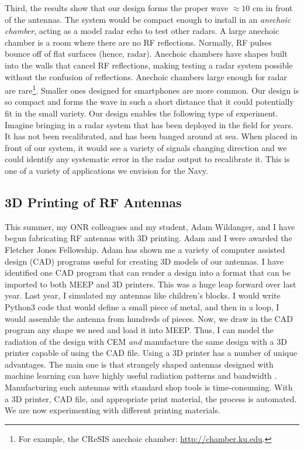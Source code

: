 \documentclass[../../../main.tex]{subfiles}
\begin{document}
Third, the results show that our design forms the proper wave $\approx 10$ cm in front of the antennas.  The system would be compact enough to install in an \textit{anechoic chamber}, acting as a model radar echo to test other radars.  A large anechoic chamber is a room where there are no RF reflections.  Normally, RF pulses bounce off of flat surfaces (hence, radar).  Anechoic chambers have shapes built into the walls that cancel RF reflections, making testing a radar system possible without the confusion of reflections.  Anechoic chambers large enough for radar are rare\footnote{For example, the CReSIS anechoic chamber: \url{http://chamber.ku.edu}.}.  Smaller ones designed for smartphones are more common.  Our design is so compact and forms the wave in such a short distance that it could potentially fit in the small variety.  Our design enables the following type of experiment. Imagine bringing in a radar system that has been deployed in the field for years.  It has not been recalibrated, and has been banged around at sea.  When placed in front of our system, it would see a variety of signals changing direction and we could identify any systematic error in the radar output to recalibrate it.  This is one of a variety of applications we envision for the Navy.

\subsection{3D Printing of RF Antennas}
\label{sec:3d_printer}

This summer, my ONR colleagues and my student, Adam Wildanger, and I have begun fabricating RF antennas with 3D printing.  Adam and I were awarded the Fletcher Jones Fellowship.  Adam has shown me a variety of computer assisted design (CAD) programs useful for creating 3D models of our antennas.  I have identified one CAD program that can render a design into a format that can be imported to both MEEP and 3D printers.  This was a huge leap forward over last year.  Last year, I simulated my antennas like children's blocks.  I would write Python3 code that would define a small piece of metal, and then in a loop, I would assemble the antenna from hundreds of pieces.  Now, we draw in the CAD program any shape we need and load it into MEEP.  Thus, I can model the radiation of the design with CEM \textit{and} manufacture the same design with a 3D printer capable of using the CAD file.  Using a 3D printer has a number of unique advantages.  The main one is that strangely shaped antennas designed with machine learning can have highly useful radiation patterns and bandwidth \cite{10.3390/electronics10121377} \cite{10.1109/access.2019.2932912}.  Manufacturing such antennas with standard shop tools is time-consuming.  With a 3D printer, CAD file, and appropriate print material, the process is automated.  We are now experimenting with different printing materials.
\end{document}
